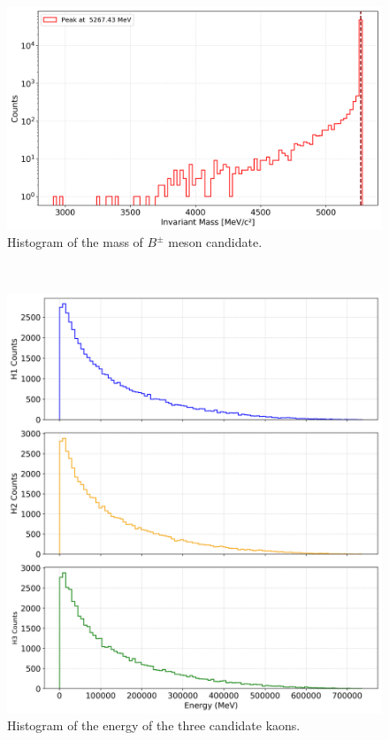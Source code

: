     \begin{figure}[H]
        \centering
        \includegraphics[scale=0.1]{Figure/hist_sim_mass.png}
        \caption{Histogram of the mass of \(B^\pm\) meson candidate.}
        \label{hist_sim_mass}
    \end{figure}
    \\
        
    \begin{figure}[H]
        \centering
        \includegraphics[scale=0.1]{Figure/hist_sim_energy.png}
        \caption{Histogram of the energy of the three candidate kaons.}
        \label{hist_sim_energy}
    \end{figure}
    \\
    
